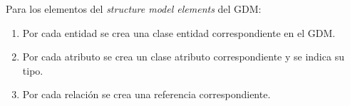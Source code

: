 Para los elementos del \textit{structure model elements} del GDM:

\begin{enumerate}
    \item Por cada entidad se crea una clase entidad correspondiente en el GDM. 
    \item Por cada atributo se crea un clase atributo correspondiente y se indica su tipo.
    \item Por cada relación se crea una referencia correspondiente.
\end{enumerate}









